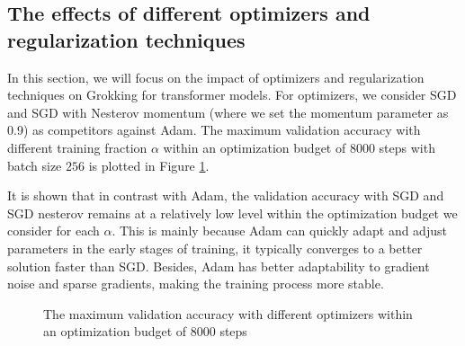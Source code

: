 \documentclass[UTF8]{article}
\begin{document}
\subsection{The effects of different optimizers and regularization techniques}
In this section, we will focus on the impact of optimizers and regularization
techniques on Grokking for transformer models. For  optimizers, we consider SGD
and SGD with Nesterov momentum (where we set the momentum parameter as
0.9) as competitors against Adam. The maximum validation accuracy with different
training fraction $\alpha$ within an optimization budget of $8000$ steps with
batch size $256$ is plotted in Figure \ref{optimizers}.

It is shown that in
contrast with Adam, the validation accuracy with SGD and SGD nesterov remains at a relatively low level within the optimization budget we consider for each $\alpha$. This is mainly because Adam can quickly adapt and adjust parameters in the early stages of training, it typically converges to a better solution faster than SGD. Besides, Adam has better adaptability to gradient noise and sparse gradients, making the training process more stable.

\begin{figure}[H]
  \centering
  \vspace{-6mm}
  \caption{The maximum
  validation accuracy with different optimizers within an optimization budget of
$8000$ steps}
  \label{optimizers} 
\end{figure}
\end{document}
